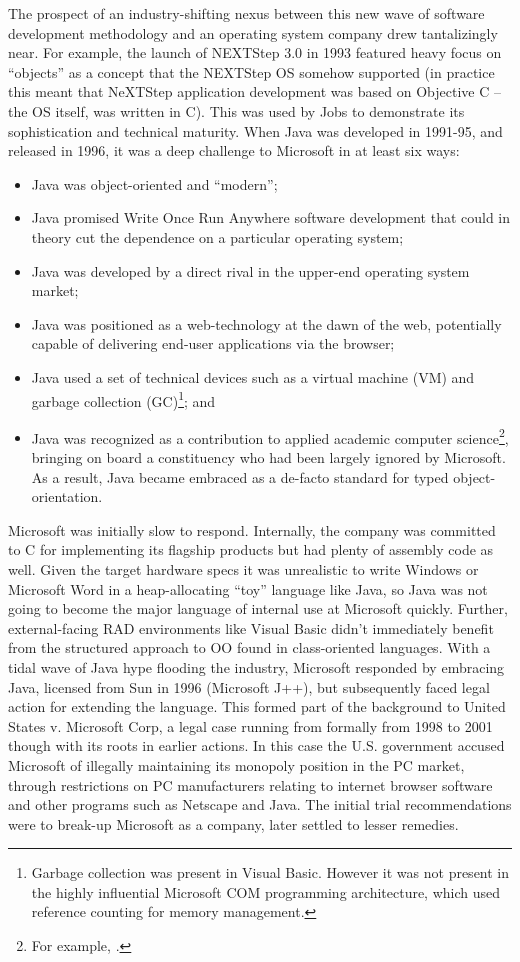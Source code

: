 \documentclass[acmsmall,review]{acmart}\settopmatter{printfolios=true,printccs=false,printacmref=false}
\begin{document}
The prospect of an industry-shifting nexus between this new wave of software development methodology and an operating system company drew tantalizingly near. For example, the launch of NEXTStep 3.0 in 1993 featured heavy focus on “objects” as a concept that the NEXTStep OS somehow supported (in practice this meant that NeXTStep application development was based on Objective C – the OS itself, was written in C). This was used by Jobs to demonstrate its sophistication and technical maturity. When Java was developed in 1991-95, and released in 1996, it was a deep challenge to Microsoft in at least six ways: 
\begin{itemize}
\item Java was object-oriented and “modern”;
\item Java promised Write Once Run Anywhere software development that could in theory cut the dependence on a particular operating system; 
\item Java was developed by a direct rival in the upper-end operating system market; 
\item Java was positioned as a web-technology at the dawn of the web, potentially capable of delivering end-user applications via the browser;
\item Java used a set of technical devices such as a virtual machine (VM) and garbage collection (GC)\footnote{ Garbage collection was present in Visual Basic. However it was not present in the highly influential Microsoft COM programming architecture, which used reference counting for memory management.};  and 
\item Java was recognized as a contribution to applied academic computer science\footnote{For example, \citep{alvesfoss99}.}, bringing on board a constituency who had been largely ignored by Microsoft. As a result, Java became embraced as a de-facto standard for typed object-orientation.
\end{itemize}

Microsoft was initially slow to respond.  Internally, the company was committed to C for implementing its flagship products but had plenty of assembly code as well. Given the target hardware specs it was unrealistic to write Windows or Microsoft Word in a heap-allocating “toy” language like Java, so Java was not going to become the major language of internal use at Microsoft quickly. Further, external-facing RAD environments like Visual Basic didn’t immediately benefit from the structured approach to OO found in class-oriented languages. With a tidal wave of Java hype flooding the industry, Microsoft responded by embracing Java, licensed from Sun in 1996 (Microsoft J++), but subsequently faced legal action for extending the language. This formed part of the background to United States v. Microsoft Corp, a legal case running from formally from 1998 to 2001 though with its roots in earlier actions. In this case the U.S. government accused Microsoft of illegally maintaining its monopoly position in the PC market, through restrictions on PC manufacturers relating to internet browser software and other programs such as Netscape and Java. The initial trial recommendations were to break-up Microsoft as a company, later settled to lesser remedies. 
\end{document}
